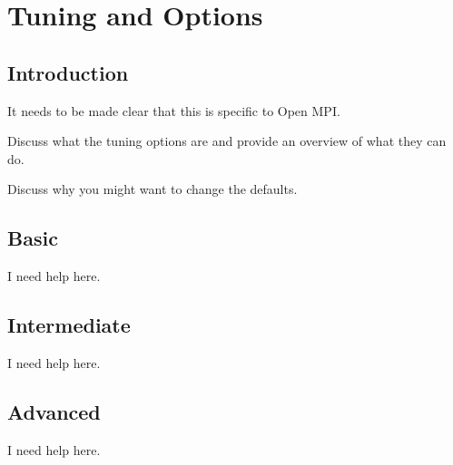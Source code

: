 \chapter{Tuning and Options}

\section{Introduction}

It needs to be made clear that this is specific to Open MPI.

Discuss what the tuning options are and provide an overview of what
they can do. 

Discuss why you might want to change the defaults.

\section{Basic}

I need help here.

\section{Intermediate}

I need help here.

\section{Advanced}

I need help here.

